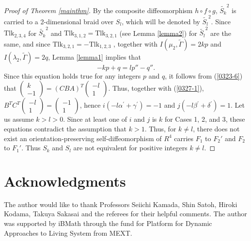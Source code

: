 \documentclass[a4paper,11pt]{amsart}
\numberwithin{equation}{section}
\begin{document}
\begin{proof}[Proof of Theorem \ref{mainthm}]
\begin{sloppypar}
By the composite diffeomorphism $h \circ f \circ g$, $\widetilde{S_k}^2$ is carried to a 2-dimensional braid over $S_l$, which will be denoted by $\widetilde{S_l}^2$. 
Since $\mathrm{Tlk}_{2,3,4}$ for $\widetilde{S_k}^2$ and $\mathrm{Tlk}_{3,1,2}=\mathrm{Tlk}_{3,2,1}$ (see Lemma \ref{lemma2}) for $\widetilde{S_l}^2$ are the same, and since $\mathrm{Tlk}_{3,2,1}=-\mathrm{Tlk}_{1,2,3}$ \cite{CJKLS}, together with $I(\mu_2, \widetilde{\Gamma})=2kp$ and $I(\lambda_2, \widetilde{\Gamma})=2q$, Lemma \ref{lemma1} implies that  
\begin{equation}\label{0325-2}
-kp+q=lp''-q''. 
\end{equation}
Since this equation holds true for any integers $p$ and $q$, it follows from (\ref{0323-6}) that   
$\begin{pmatrix} k \\ -1 \end{pmatrix}=(CBA)^T \begin{pmatrix}-l \\ 1 \end{pmatrix}$. 
Thus, together with (\ref{0327-1}), $B^T C^T\begin{pmatrix}-l \\ 1 \end{pmatrix}=\begin{pmatrix} -1 \\ 1 \end{pmatrix}$, hence  
$i(-l\alpha^\prime+\gamma^\prime)=-1$ and $j (-l\beta^\prime+\delta^\prime)=1$. 
Let us assume $k>l>0$. Since at least one of $i$ and $j$ is $k$ for Cases 1, 2, and 3, these equations contradict the assumption that $k>1$. Thus, for $k \neq l$, there does not exist an orientation-preserving self-diffeomorphism of $R^4$ carries $F_1$ to $F_2'$ and $F_2$ to $F_1'$. Thus $S_k$ and $S_l$ are not equivalent for positive integers $k \neq l$. 
\end{sloppypar}
\end{proof}
 
\section*{Acknowledgments}
The author would like to thank Professors Seiichi Kamada, Shin Satoh, Hiroki Kodama, Takuya Sakasai and the referees for their helpful comments. 
The author was supported by iBMath through the fund for Platform for Dynamic Approaches to Living System from MEXT. 
\end{document}

